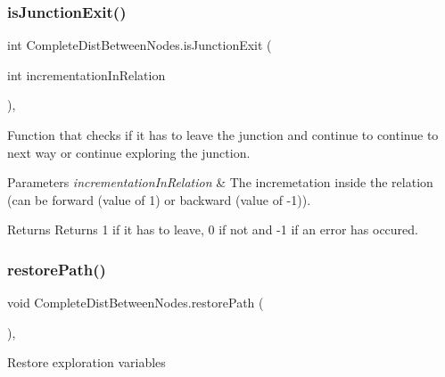 \subsubsection{\texorpdfstring{is\+Junction\+Exit()}{isJunctionExit()}}
{\footnotesize\ttfamily int Complete\+Dist\+Between\+Nodes.\+is\+Junction\+Exit (\begin{DoxyParamCaption}\item[{int}]{incrementation\+In\+Relation }\end{DoxyParamCaption})\hspace{0.3cm}{\ttfamily [inline]}, {\ttfamily [private]}}



Function that checks if it has to leave the junction and continue to continue to next way or continue exploring the junction. 


\begin{DoxyParams}{Parameters}
{\em incrementation\+In\+Relation} & The incremetation inside the relation (can be forward (value of 1) or backward (value of -\/1)).\\
\hline
\end{DoxyParams}
\begin{DoxyReturn}{Returns}
Returns 1 if it has to leave, 0 if not and -\/1 if an error has occured.
\end{DoxyReturn}
\mbox{\label{classCompleteDistBetweenNodes_a137c8c63db5a1a530d97cd4ecfbcf3ee}} 
\subsubsection{\texorpdfstring{restore\+Path()}{restorePath()}}
{\footnotesize\ttfamily void Complete\+Dist\+Between\+Nodes.\+restore\+Path (\begin{DoxyParamCaption}{ }\end{DoxyParamCaption})\hspace{0.3cm}{\ttfamily [inline]}, {\ttfamily [private]}}



Restore exploration variables 

\mbox{\label{classCompleteDistBetweenNodes_ae99818fb0ba9602c2025269d8550944d}} 
